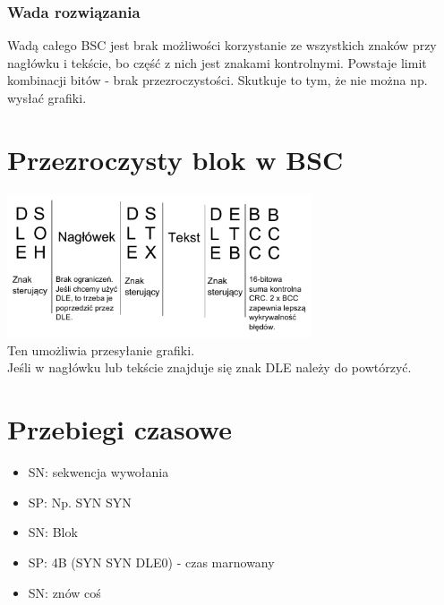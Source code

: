 			\subsubsection{Wada rozwiązania}
				Wadą całego BSC jest brak możliwości korzystanie ze wszystkich znaków przy nagłówku i tekście, bo część z nich jest znakami kontrolnymi. Powstaje limit kombinacji bitów - brak przezroczystości. Skutkuje to tym, że nie można np. wysłać grafiki.
	\section{Przezroczysty blok w BSC}
		\includegraphics[width=9cm]{./images/image11.pdf}\\
		Ten umożliwia przesyłanie grafiki.\\
		Jeśli w nagłówku lub tekście znajduje się znak DLE należy do powtórzyć.
	\section{Przebiegi czasowe}
		\begin{itemize}
			\item SN: sekwencja wywołania
			\item SP: Np. SYN SYN
			\item SN: Blok
			\item SP: 4B (SYN SYN DLE0) - czas marnowany
			\item SN: znów coś
		\end{itemize}


